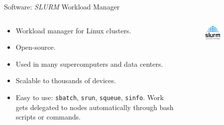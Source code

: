 
\begin{frame}{Software: \textit{SLURM} Workload Manager}
    \begin{columns}
        \begin{column}{0.6\textwidth}
            \begin{itemize}
                \item Workload manager for Linux clusters.
                \item Open-source.
                \item Used in many supercomputers and data centers.
                \item Scalable to thousands of devices.
                \item Easy to use: \texttt{sbatch}, \texttt{srun}, \texttt{squeue}, \texttt{sinfo}.
                      Work gets delegated to nodes automatically through bash scripts or commands.
            \end{itemize}
        \end{column}
        \begin{column}{0.4\textwidth}
            \begin{figure}
                \centering
                \includegraphics[width=0.5\textwidth]{images/slurm_logo.png}
            \end{figure}
        \end{column}
    \end{columns}
\end{frame}


